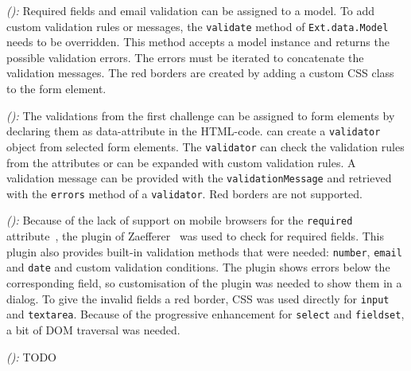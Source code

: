 \documentclass[a4paper]{artikel3}
\newcommand{\code}[1]{\texttt{#1}}
\newcommand{\framework}[2]{ \emph{#1 (\textbf{#2}): }} %
\begin{document}
\framework{\sta{}}{}
Required fields and email validation can be assigned to a model.  
To add custom validation rules or messages,  the \code{validate} method of \code{Ext.data.Model} needs to be overridden.  
This method accepts a model instance and returns the possible validation errors.  
The errors must be iterated to concatenate the validation messages.
The red borders are created by adding a custom CSS class to the form element.

\framework{\kendoa{}}{}
The validations from the first challenge can be assigned to form elements by declaring them as data-attribute in the HTML-code.
\kendo{} can create a \code{validator} object from selected form elements.
The \code{validator} can check the validation rules from the attributes or can be expanded with custom validation rules.
A validation message can be provided with the \code{validationMessage} and retrieved with the \code{errors} method of a \code{validator}.
Red borders are not supported.

\framework{\jqma{}}{}
Because of the lack of support on mobile browsers for the \code{required} attribute~\cite{Deveria2013}, the plugin of Zaefferer~\cite{Zaefferer2013} was used to check for required fields.
This plugin also provides built-in validation methods that were needed: \code{number}, \code{email} and \code{date} and custom validation conditions.
The plugin shows errors below the corresponding field, so customisation of the plugin was needed to show them in a dialog.
To give the invalid fields a red border, CSS was used directly for \code{input} and \code{textarea}.
Because of the progressive enhancement for \code{select} and \code{fieldset}, a bit of DOM traversal was needed.

\framework{\lungoa{}}{}
TODO


% 
% 
\end{document}
